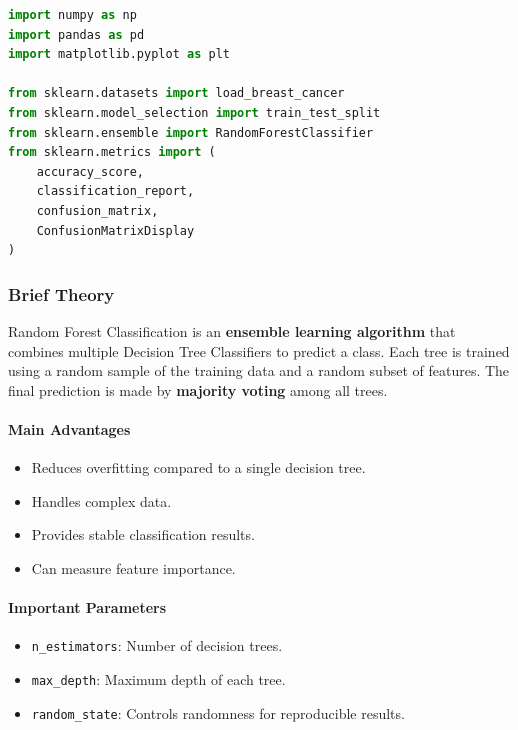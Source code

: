 \documentclass[a4paper,11pt]{article}
\begin{document}
\begin{lstlisting}[language=Python, caption={Required Imports}]
import numpy as np
import pandas as pd
import matplotlib.pyplot as plt

from sklearn.datasets import load_breast_cancer
from sklearn.model_selection import train_test_split
from sklearn.ensemble import RandomForestClassifier
from sklearn.metrics import (
    accuracy_score,
    classification_report,
    confusion_matrix,
    ConfusionMatrixDisplay
)
\end{lstlisting}

\subsubsection{Brief Theory}
Random Forest Classification is an \textbf{ensemble learning algorithm} that combines multiple Decision Tree Classifiers to predict a class. Each tree is trained using a random sample of the training data and a random subset of features. The final prediction is made by \textbf{majority voting} among all trees.

\paragraph{Main Advantages}
\begin{itemize}
    \item Reduces overfitting compared to a single decision tree.
    \item Handles complex data.
    \item Provides stable classification results.
    \item Can measure feature importance.
\end{itemize}

\paragraph{Important Parameters}
\begin{itemize}
    \item \texttt{n\_estimators}: Number of decision trees.
    \item \texttt{max\_depth}: Maximum depth of each tree.
    \item \texttt{random\_state}: Controls randomness for reproducible results.
\end{itemize}
\end{document}
